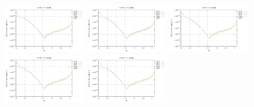 \noindent
\includegraphics[width=3.5cm]{python_codes/fieldstone_152/RESULTS/exp2/sr2_16_m2}
\includegraphics[width=3.5cm]{python_codes/fieldstone_152/RESULTS/exp2/sr2_16_m3}
\includegraphics[width=3.5cm]{python_codes/fieldstone_152/RESULTS/exp2/sr2_16_m4}
\includegraphics[width=3.5cm]{python_codes/fieldstone_152/RESULTS/exp2/sr2_16_m5}
\includegraphics[width=3.5cm]{python_codes/fieldstone_152/RESULTS/exp2/sr2_16_m6}

